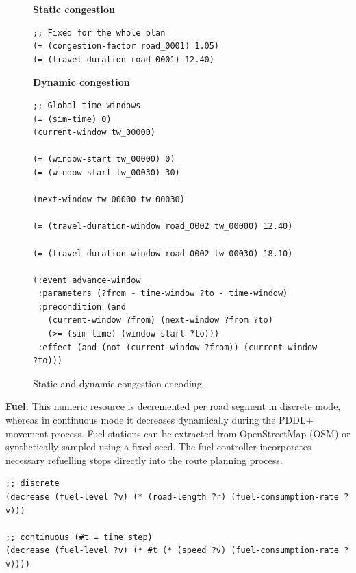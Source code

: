 \documentclass[10pt]{article}
\begin{document}
\begin{figure}[H]
\centering

\begin{minipage}[t]{0.47\textwidth}
\centering
\textbf{Static congestion}

\begin{lstlisting}[basicstyle=\ttfamily\tiny]
;; Fixed for the whole plan
(= (congestion-factor road_0001) 1.05)
(= (travel-duration road_0001) 12.40)
\end{lstlisting}
\end{minipage}
\hfill
\begin{minipage}[t]{0.49\textwidth}
\centering
\textbf{Dynamic congestion}

\begin{lstlisting}[basicstyle=\ttfamily\tiny]
;; Global time windows
(= (sim-time) 0)
(current-window tw_00000)

(= (window-start tw_00000) 0)
(= (window-start tw_00030) 30)

(next-window tw_00000 tw_00030)

(= (travel-duration-window road_0002 tw_00000) 12.40)

(= (travel-duration-window road_0002 tw_00030) 18.10)

(:event advance-window
 :parameters (?from - time-window ?to - time-window)
 :precondition (and
   (current-window ?from) (next-window ?from ?to)
   (>= (sim-time) (window-start ?to)))
 :effect (and (not (current-window ?from)) (current-window ?to)))
\end{lstlisting}
\end{minipage}

\caption{Static and dynamic congestion encoding.}
\label{fig:congestion-encoding}
\end{figure}

\textbf{Fuel.} This numeric resource is decremented per road segment in discrete mode, whereas in continuous mode it decreases dynamically during the PDDL+ movement process. Fuel stations can be extracted from OpenStreetMap (OSM) or synthetically sampled using a fixed seed. The fuel controller incorporates necessary refuelling stops directly into the route planning process.

\vspace{0.5em}
\begin{lstlisting}
;; discrete 
(decrease (fuel-level ?v) (* (road-length ?r) (fuel-consumption-rate ?v)))

;; continuous (#t = time step)
(decrease (fuel-level ?v) (* #t (* (speed ?v) (fuel-consumption-rate ?v))))
\end{lstlisting}
\end{document}
